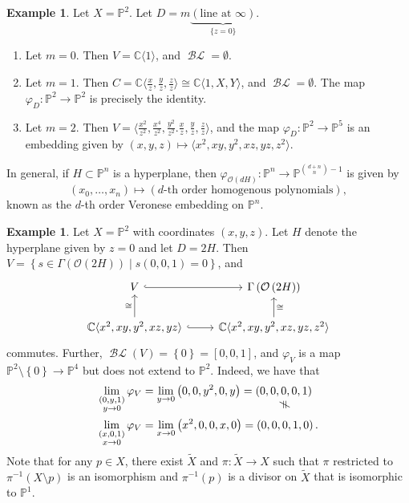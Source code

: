 \documentclass[10pt,letterpaper,cm]{nupset}
\theoremstyle{definition}
\newtheorem{exmp}[defn]{Example}
\theoremstyle{theorem}
\theoremstyle{remark}
\newcommand{\C}{\mathbb C}
\renewcommand{\O}{\mathcal O}
\renewcommand{\P}{\mathbb P}
\newcommand{\1}{\mathbb{1}}
\newcommand{\0}{\vec 0}
\DeclareMathOperator{\BL}{\mathcal{BL}}
\newcommand{\vertneq}{\rotatebox{90}{$\,\neq$}}
\newcommand{\net}[2]{\underset{\scriptstyle\overset{\mkern4mu\vertneq}{#2}}{#1}}
\newcommand{\be}{\begin{enumerate}}
\newcommand{\ee}{\end{enumerate}}
\begin{document}
\begin{exmp} Let $X = \P^2$. Let $D= m\underbrace{\left(\text{line at }\infty\right)}_{\{z=0\}}$.
\be
\item Let $m=0$. Then $V = \C\langle 1\rangle$, and $\BL= \emptyset$.
\item Let $m=1$. Then $C = \C\langle \frac{x}{z}, \frac{y}{z}, \frac{z}{z}\rangle \cong \C\langle 1, X, Y\rangle$, and $\BL = \emptyset$. The map $\varphi_D : \P^2 \to \P^2$ is precisely the identity. 
\item Let $m=2$. Then $V = \langle \frac{x^2}{z^2}, \frac{x^4}{z^2}, \frac{y^2}{z^2}. \frac{x}{z}, \frac{y}{z}, \frac{z}{z}\rangle$, and the map $\varphi_D : \P^2 \to \P^5$ is an embedding given by $(x,y,z) \mapsto \langle x^2, xy, y^2, xz, yz, z^2\rangle$.
\ee
\end{exmp}

In general, if $H\subset \P^n$ is a hyperplane, then $\varphi_{\O\left(d{H}\right)} : \P^n \to \P^{{{d+n}\choose n} -1}$ is given by $$\left(x_0, \ldots, x_n\right) \mapsto \left(d\text{-th order homogenous polynomials}\right),$$  known as the $d$-th order Veronese embedding on $\P^n$.

\begin{exmp}
Let $X = \P^2$ with coordinates $\left(x,y,z\right)$. Let $H$ denote the hyperplane given by $z=0$ and let $D = 2{H}$. Then $ V= \left\{s\in \Gamma  \left(\O\left(2{H}\right)\right) \mid s\left(0,0,1\right) =0\right\}$, and
\[
\begin{tikzcd}
V \arrow[r, hook]                                                         & \Gamma\left(\O\left(2{H}\right)\right)                           \\
{\C\langle x^2, xy, y^2, xz,yz\rangle} \arrow[r, hook] \arrow[u, "\cong"] & {\C\langle x^2, xy, y^2, xz, yz, z^2\rangle} \arrow[u, "\cong"']
\end{tikzcd}
\] commutes. Further, $\BL(V) = \left\{0\right\} = \left[0,0,1\right]$, and $\varphi_V$ is a map $\P^2 \setminus \left\{0\right\} \to \P^4$ but does not extend to $\P^2$. Indeed, we have that
\begin{align*}
\lim_{\substack{\left(0, y, 1\right) \\ y\to 0}} \varphi_V  & = \lim_{y\to0}\left(0,0,y^2,0, y\right)= \net{\left(0,0,0,0,1\right)}{}
\\ \lim_{\substack{\left(x, 0, 1\right) \\ x\to 0}} \varphi_V  & = \lim_{x\to0}\left(x^2,0,0,x, 0\right)= \left(0,0,0,1,0\right).
\end{align*} Note that for any $p\in X$, there exist $\widetilde{X}$ and $\pi : \widetilde{X}\to X$ such that $\pi$ restricted to $\pi^{-1}\left(X\setminus p\right)$ is an isomorphism and $\pi^{-1}(p)$ is a divisor on $\widetilde{X}$ that is isomorphic to $\P^1$.
\end{exmp}
\end{document}
